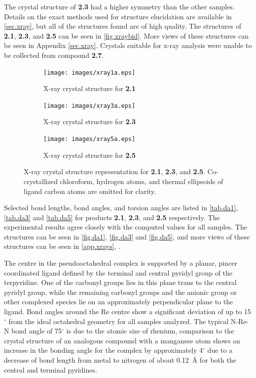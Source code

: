 The crystal structure of \textbf{2.3} had a higher symmetry than the other samples. Details on the exact methods used for structure elucidation are available in \autoref{sec.xray}, but all of the structures found are of high quality. The structures of \textbf{2.1}, \textbf{2.3}, and \textbf{2.5} can be seen in \autoref{fig.xraybid}. More views of these structures can be seen in Appendix \autoref{sec.xray}. Crystals suitable for x-ray analysis were unable to be collected from compound \textbf{2.7}. 

\begin{figure}[!ht]
 \centering
 \begin{subfigure}[b]{0.49\textwidth}
  \texttt{[image: images/xray1a.eps]}
  \caption{X-ray crystal structure for \textbf{2.1}}
  \label{fig.da1}
 \end{subfigure}
 \begin{subfigure}[b]{0.49\textwidth}
  \texttt{[image: images/xray3a.eps]}
  \caption{X-ray crystal structure for \textbf{2.3}}
  \label{fig.da3}
 \end{subfigure}
 \begin{subfigure}[b]{0.49\textwidth}
  \texttt{[image: images/xray5a.eps]}
  \caption{X-ray crystal structure for \textbf{2.5}}
  \label{fig.da5}
 \end{subfigure}
\caption[X-ray crystal structure representation for \textbf{2.1}, \textbf{2.3} and \textbf{2.5}.]{X-ray crystal structure representation for \textbf{2.1}, \textbf{2.3}, and \textbf{2.5}. Co-crystallized chloroform, hydrogen atoms, and thermal ellipsoids of ligand carbon atoms are omitted for clarity.}
\label{fig.xraybid}
\end{figure}

Selected bond lengths, bond angles, and torsion angles are listed in \autoref{tab.da1}, \autoref{tab.da3} and \autoref{tab.da5} for products \textbf{2.1}, \textbf{2.3}, and \textbf{2.5} respectively. The experimental results agree closely with the computed values for all samples. The structures can be seen in \autoref{fig.da1}, \autoref{fig.da3} and \autoref{fig.da5}, and more views of these structures can be seen in \autoref{app.xrays}, . 

The  centre in the pseudooctahedral complex is supported by a planar, pincer coordinated ligand defined by the terminal and central pyridyl group of the terpyridine. One of the carbonyl groups lies in this plane trans to the central pyridyl group, while the remaining carbonyl groups and the anionic group or other complexed species lie on an approximately perpendicular plane to the ligand. Bond angles around the Re centre show a significant deviation of up to 15$^\circ$ from the ideal octahedral geometry for all samples analyzed. The typical N-Re-N bond angle of 75$^\circ$ is due to the atomic size of rhenium, comparison to the crystal structure of an analogous compound with a manganese atom\autocite{compain2014} shows an increase in the bonding angle for the  complex by approximately 4$^\circ$ due to a decrease of bond length from metal to nitrogen of about 0.12~\r{A} for both the central and terminal pyridines. 

